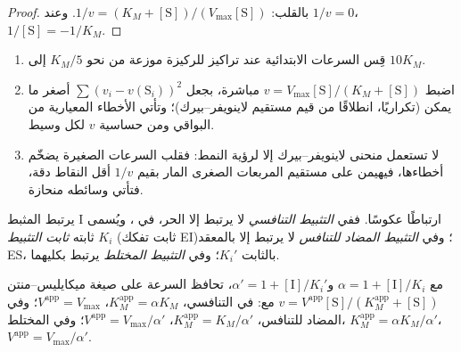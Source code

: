 \begin{proof}
بالقلب: $1/v = (K_M + [\mathrm S])/(V_{\max}[\mathrm S])$. وعند $1/v = 0$، $1/[\mathrm S] = -1/K_M$.
\end{proof}

\begin{method}\label{met:b3:complex-kinetics:mm-fit}
\begin{enumerate}
  \item قِس السرعات الابتدائية عند تراكيز للركيزة موزعة من نحو
        $K_M/5$ إلى $10K_M$.
  \item اضبط $v = V_{\max}[\mathrm S]/(K_M + [\mathrm S])$ مباشرة، بجعل $\sum(v_i - v(\mathrm S_i))^2$ أصغر ما يمكن (تكراريًا،
        انطلاقًا من قيم مستقيم لاينويفر--بيرك)؛ وتأتي الأخطاء
        المعيارية من البواقي ومن حساسية $v$ لكل
        وسيط.
  \item لا تستعمل منحنى لاينويفر--بيرك إلا لرؤية النمط: فقلب السرعات
        الصغيرة يضخّم أخطاءها، فيهيمن على مستقيم المربعات الصغرى المار بقيم $1/v$
        أقل النقاط دقة، فتأتي وسائطه
        منحازة.
\end{enumerate}
\end{method}

\begin{definition}[التثبيط]\label{def:b3:complex-kinetics:inhibition}
يرتبط المثبط I  ارتباطًا عكوسًا. ففي \emph{التثبيط
التنافسي} لا يرتبط إلا  الحر، في
، ويُسمى ثابته \emph{ثابت التثبيط} $K_i$
(ثابت تفكك EI)؛ وفي \emph{التثبيط المضاد للتنافس}
لا يرتبط إلا بالمعقد ES، بالثابت $K_i'$؛ وفي \emph{التثبيط
المختلط} يرتبط بكليهما.
\end{definition}

\begin{proposition}\label{prop:b3:complex-kinetics:inhibition-laws}
مع $\alpha = 1 + [\mathrm I]/K_i$ و$\alpha' = 1 + [\mathrm I]/K_i'$، تحافظ السرعة على
صيغة ميكايليس--منتن $v = V^{\mathrm{app}}[\mathrm S]/(K_M^{\mathrm{app}} + [\mathrm S])$ مع: في التنافسي،
$K_M^{\mathrm{app}} = \alpha K_M$، $V^{\mathrm{app}} = V_{\max}$؛ وفي المضاد للتنافس، $K_M^{\mathrm{app}} = K_M/\alpha'$، $V^{\mathrm{app}} =
V_{\max}/\alpha'$؛ وفي المختلط، $K_M^{\mathrm{app}} = \alpha K_M/\alpha'$، $V^{\mathrm{app}} = V_{\max}/\alpha'$.
\end{proposition}

